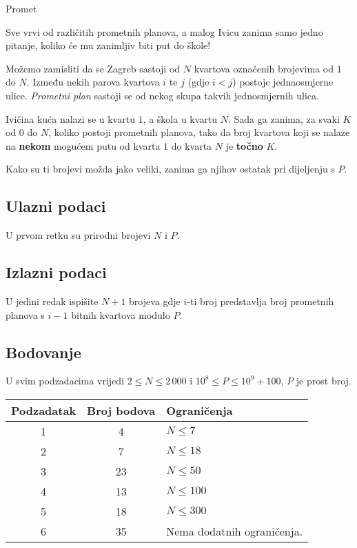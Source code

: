 \begin{statement}[
  problempoints=100,
  timelimit=1 sekunda,
  memorylimit=1024 MiB,
]{Promet}\

Sve vrvi od različitih prometnih planova, a malog Ivicu zanima samo jedno pitanje, koliko će mu zanimljiv biti put do škole!

Možemo zamisliti da se Zagreb sastoji od $N$ kvartova označenih brojevima od $1$ do $N$. Između nekih parova kvartova $i$ te $j$ (gdje $i < j$) postoje jednaosmjerne ulice. \textit{Prometni plan} sastoji se od nekog skupa takvih jednosmjernih ulica. 

Ivičina kuća nalazi se u kvartu $1$, a škola u kvartu $N$. Sada ga zanima, za svaki $K$ od $0$ do $N$, koliko postoji prometnih planova, tako da broj kvartova koji se nalaze na \textbf{nekom} mogućem putu od kvarta $1$ do kvarta $N$ je \textbf{točno} $K$.

Kako su ti brojevi možda jako veliki, zanima ga njihov ostatak pri dijeljenju s $P$.


\subsection*{Ulazni podaci}

U prvom retku su prirodni brojevi $N$ i $P$.

\subsection*{Izlazni podaci}

U jedini redak ispišite $N + 1$ brojeva gdje $i$-ti broj predstavlja broj prometnih planova s $i - 1$ bitnih kvartova modulo $P$.

\subsection*{Bodovanje}

U svim podzadacima vrijedi $2 \leq N \leq 2\,000$ i $10^8 \leq P \leq 10^9 + 100$, $P$ je prost broj.

{\renewcommand{\arraystretch}{1.4}
  \setlength{\tabcolsep}{6pt}
  \begin{tabular}{ccl}
   Podzadatak & Broj bodova & Ograničenja \\ \midrule
   	1 & 4 & $N \leq 7$ \\
    2 & 7 & $N \leq 18$ \\
    3 & 23 & $N \leq 50$ \\
    4 & 13 & $N \leq 100$ \\
    5 & 18 & $N \leq 300$ \\
    6 & 35 & Nema dodatnih ograničenja. \\
\end{tabular}}


\end{statement}
